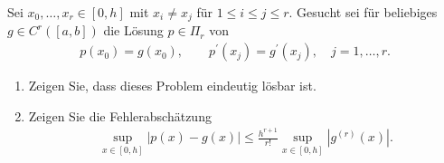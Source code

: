 \begin{exercise}
Sei $x_0,\dots,x_r \in [0,h]$ mit $x_i \neq x_j$ für $1 \leq i \leq j \leq r$.
Gesucht sei für beliebiges $g \in C^r([a,b])$ die Lösung $p \in \Pi_r$ von
\begin{align}
  p(x_0) = g(x_0), \qquad p^{\prime}(x_j) = g^{\prime}(x_j), \quad j = 1,\dots,r.
\end{align}
\begin{enumerate}[label = \textbf{\alph*)}]
  \item Zeigen Sie, dass dieses Problem eindeutig lösbar ist.
  \item Zeigen Sie die Fehlerabschätzung
  \begin{align}
    \sup_{x \in [0,h]} |p(x) - g(x)| \leq \frac{h^{r+1}}{r!}
    \sup_{x \in [0,h]}\left|g^{(r)}(x)\right|.
  \end{align}
\end{enumerate}
\end{exercise}
